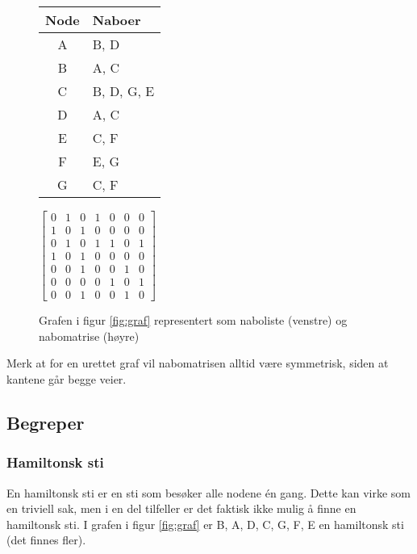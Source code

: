 \begin{figure}[H]
\centering
\caption{Grafen i figur \ref{fig:graf} representert som naboliste (venstre) og nabomatrise (høyre)}
\begin{tabular}{c | l}
Node & Naboer \\ \hline
A & B, D \\
B & A, C \\
C & B, D, G, E \\
D & A, C \\
E & C, F \\
F & E, G \\
G & C, F
\end{tabular}\quad\quad\quad
$ \begin{bmatrix}
0 & 1 & 0 & 1 & 0 & 0 & 0 \\
1 & 0 & 1 & 0 & 0 & 0 & 0 \\
0 & 1 & 0 & 1 & 1 & 0 & 1 \\
1 & 0 & 1 & 0 & 0 & 0 & 0 \\
0 & 0 & 1 & 0 & 0 & 1 & 0 \\
0 & 0 & 0 & 0 & 1 & 0 & 1 \\
0 & 0 & 1 & 0 & 0 & 1 & 0 
\end{bmatrix} $
\end{figure}
Merk at for en urettet graf vil nabomatrisen alltid være symmetrisk, siden at kantene går begge veier. 


\subsection{Begreper}

\subsubsection{Hamiltonsk sti}
En hamiltonsk sti er en sti som besøker alle nodene én gang. Dette kan virke som en triviell sak, men i en del tilfeller er det faktisk ikke mulig å finne en hamiltonsk sti. I grafen i figur \ref{fig:graf} er B, A, D, C, G, F, E en hamiltonsk sti (det finnes fler). 


%
%



